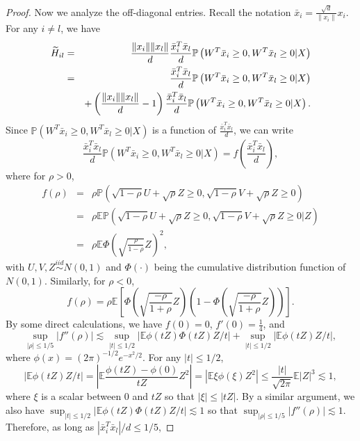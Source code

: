 \begin{proof}
Now we analyze the off-diagonal entries. Recall the notation $\bar{x}_i=\frac{\sqrt{d}}{\|x_i\|}x_i$. For any $i\neq l$, we have
\begin{eqnarray}
\nonumber \wt{H}_{il} &=& \frac{\|x_i\|\|x_l\|}{d}\frac{\bar{x}_i^T\bar{x}_l}{d}\mathbb{P}\left(W^T\bar{x}_i\geq 0, W^T\bar{x}_l\geq 0|X\right) \\
\label{eq:H-tilde-il-relu} &=& \frac{\bar{x}_i^T\bar{x}_l}{d}\mathbb{P}\left(W^T\bar{x}_i\geq 0, W^T\bar{x}_l\geq 0|X\right) \\
\nonumber && + \left(\frac{\|x_i\|\|x_l\|}{d}-1\right)\frac{\bar{x}_i^T\bar{x}_l}{d}\mathbb{P}\left(W^T\bar{x}_i\geq 0, W^T\bar{x}_l\geq 0|X\right).
\end{eqnarray}
Since $\mathbb{P}\left(W^T\bar{x}_i\geq 0, W^T\bar{x}_l\geq 0|X\right)$ is a function of $\frac{\bar{x}_i^T\bar{x}_l}{d}$, we can write
\begin{equation}
\frac{\bar{x}_i^T\bar{x}_l}{d}\mathbb{P}\left(W^T\bar{x}_i\geq 0, W^T\bar{x}_l\geq 0|X\right)=f\left(\frac{\bar{x}_i^T\bar{x}_l}{d}\right), \label{eq:f-H-tilde-relu}
\end{equation}
where for $\rho>0$,
\begin{eqnarray*}
f(\rho) &=& \rho\mathbb{P}\left(\sqrt{1-\rho}U+\sqrt{\rho}Z\geq 0, \sqrt{1-\rho}V+\sqrt{\rho}Z\geq0\right) \\
&=& \rho\mathbb{E}\mathbb{P}\left(\sqrt{1-\rho}U+\sqrt{\rho}Z\geq 0, \sqrt{1-\rho}V+\sqrt{\rho}Z\geq 0|Z\right) \\
&=& \rho\mathbb{E}\Phi\left(\sqrt{\frac{\rho}{1-\rho}}Z\right)^2,
\end{eqnarray*}
with $U,V,Z\stackrel{iid}{\sim} N(0,1)$ and $\Phi(\cdot)$ being the cumulative distribution function of $N(0,1)$. Similarly, for $\rho<0$,
$$f(\rho) = \rho\mathbb{E}\left[\Phi\left(\sqrt{\frac{-\rho}{1+\rho}}Z\right)\left(1-\Phi\left(\sqrt{\frac{-\rho}{1+\rho}}Z\right)\right)\right].$$
By some direct calculations, we have $f(0)=0$, $f'(0)=\frac{1}{4}$, and
$$\sup_{|\rho|\leq 1/5}|f''(\rho)|\lesssim \sup_{|t|\leq 1/2}\left|\mathbb{E}\phi(tZ)\Phi(tZ)Z/t\right| + \sup_{|t|\leq 1/2}\left|\mathbb{E}\phi(tZ)Z/t\right|,$$
where $\phi(x)=(2\pi)^{-1/2}e^{-x^2/2}$. For any $|t|\leq 1/2$,
$$
\left|\mathbb{E}\phi(tZ)Z/t\right| = \left|\mathbb{E}\frac{\phi(tZ)-\phi(0)}{tZ}Z^2\right| = \left|\mathbb{E}\xi\phi(\xi)Z^2\right| \leq \frac{|t|}{\sqrt{2\pi}}\mathbb{E}|Z|^3\lesssim 1,
$$
where $\xi$ is a scalar between $0$ and $tZ$ so that $|\xi|\leq |tZ|$. By a similar argument, we also have $\sup_{|t|\leq 1/2}\left|\mathbb{E}\phi(tZ)\Phi(tZ)Z/t\right|\lesssim 1$ so that $\sup_{|\rho|\leq 1/5}|f''(\rho)|\lesssim 1$. Therefore, as long as $|\bar{x}_i^T\bar{x}_l|/d\leq 1/5$,

\end{proof}

